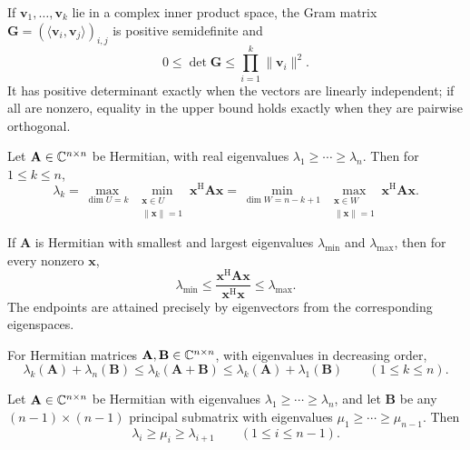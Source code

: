 \begin{theorem}
If $\mathbf{v}_1,\dots,\mathbf{v}_k$ lie in a complex inner product space, the Gram matrix $\mathbf{G}=(\langle\mathbf{v}_i,\mathbf{v}_j\rangle)_{i,j}$ is positive semidefinite and
\[
 0\le\det\mathbf{G}\le\prod_{i=1}^k\|\mathbf{v}_i\|^2.
\]
It has positive determinant exactly when the vectors are linearly independent; if all are nonzero, equality in the upper bound holds exactly when they are pairwise orthogonal.
\end{theorem}

\begin{theorem}
Let $\mathbf{A}\in\mathbb{C}^{n\times n}$ be Hermitian, with real eigenvalues $\lambda_1\ge\cdots\ge\lambda_n$. Then for $1\le k\le n$,
\[
 \lambda_k=\max_{\dim U=k}\ \min_{\substack{\mathbf{x}\in U\\\|\mathbf{x}\|=1}}
 \mathbf{x}^{\mathrm{H}}\mathbf{A}\mathbf{x}
 =\min_{\dim W=n-k+1}\ \max_{\substack{\mathbf{x}\in W\\\|\mathbf{x}\|=1}}
 \mathbf{x}^{\mathrm{H}}\mathbf{A}\mathbf{x}.
\]
\end{theorem}

\begin{theorem}
If $\mathbf{A}$ is Hermitian with smallest and largest eigenvalues $\lambda_{\min}$ and $\lambda_{\max}$, then for every nonzero $\mathbf{x}$,
\[
 \lambda_{\min}\le\frac{\mathbf{x}^{\mathrm{H}}\mathbf{A}\mathbf{x}}{\mathbf{x}^{\mathrm{H}}\mathbf{x}}
 \le\lambda_{\max}.
\]
The endpoints are attained precisely by eigenvectors from the corresponding eigenspaces.
\end{theorem}

\begin{theorem}
For Hermitian matrices $\mathbf{A},\mathbf{B}\in\mathbb{C}^{n\times n}$, with eigenvalues in decreasing order,
\[
 \lambda_k(\mathbf{A})+\lambda_n(\mathbf{B})
 \le\lambda_k(\mathbf{A}+\mathbf{B})
 \le\lambda_k(\mathbf{A})+\lambda_1(\mathbf{B})
 \qquad(1\le k\le n).
\]
\end{theorem}

\begin{theorem}
Let $\mathbf{A}\in\mathbb{C}^{n\times n}$ be Hermitian with eigenvalues $\lambda_1\ge\cdots\ge\lambda_n$, and let $\mathbf{B}$ be any $(n-1)\times(n-1)$ principal submatrix with eigenvalues $\mu_1\ge\cdots\ge\mu_{n-1}$. Then
\[
 \lambda_i\ge\mu_i\ge\lambda_{i+1}\qquad(1\le i\le n-1).
\]
\end{theorem}

